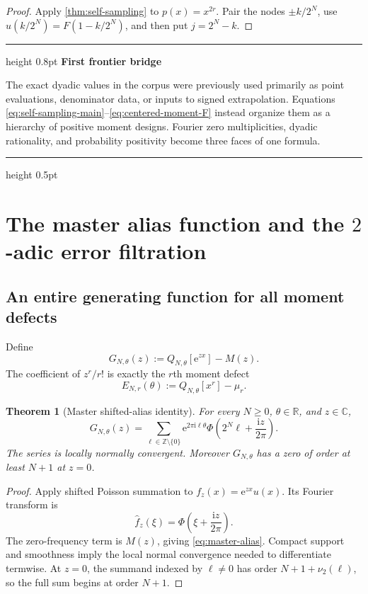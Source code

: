 \documentclass[11pt]{article}
\numberwithin{equation}{section}
\newtheorem{theorem}{Theorem}[section]
\theoremstyle{definition}
\theoremstyle{remark}
\newenvironment{resultbox}[1][]
{\begin{center}\begin{minipage}{0.94\textwidth}%
\color{navy}\hrule height 0.8pt\vspace{0.45em}%
\color{black}\textbf{#1}\par\smallskip}
{\vspace{0.35em}\color{navy}\hrule height 0.5pt\end{minipage}\end{center}}
\newcommand{\R}{\mathbb R}
\newcommand{\Z}{\mathbb Z}
\newcommand{\C}{\mathbb C}
\newcommand{\e}{\mathrm e}
\newcommand{\iu}{\mathrm i}
\begin{document}
\begin{proof}
Apply \cref{thm:self-sampling} to $p(x)=x^{2r}$.  Pair the nodes $\pm k/2^N$, use $u(k/2^N)=F(1-k/2^N)$, and then put $j=2^N-k$.
\end{proof}

\begin{resultbox}[First frontier bridge]
The exact dyadic values in the corpus were previously used primarily as point evaluations, denominator data, or inputs to signed extrapolation.  Equations \eqref{eq:self-sampling-main}--\eqref{eq:centered-moment-F} instead organize them as a hierarchy of positive moment designs.  Fourier zero multiplicities, dyadic rationality, and probability positivity become three faces of one formula.
\end{resultbox}

\section{The master alias function and the $2$-adic error filtration}
\label{sec:alias}

\subsection{An entire generating function for all moment defects}

Define
\begin{equation}
 G_{N,\theta}(z)
 :=Q_{N,\theta}[\e^{zx}]-M(z).
 \label{eq:G-def}
\end{equation}
The coefficient of $z^r/r!$ is exactly the $r$th moment defect
\begin{equation}
 E_{N,r}(\theta)
 :=Q_{N,\theta}[x^r]-\mu_r.
 \label{eq:ENr-def}
\end{equation}

\begin{theorem}[Master shifted-alias identity]
\label{thm:master-alias}
For every $N\ge0$, $\theta\in\R$, and $z\in\C$,
\begin{equation}
 \boxed{\displaystyle
 G_{N,\theta}(z)
 =\sum_{\ell\in\Z\setminus\{0\}}
 \e^{2\pi\iu\ell\theta}
 \Phi\!\left(2^N\ell+\frac{\iu z}{2\pi}\right).}
 \label{eq:master-alias}
\end{equation}
The series is locally normally convergent.  Moreover $G_{N,\theta}$ has a zero of order at least $N+1$ at $z=0$.
\end{theorem}

\begin{proof}
Apply shifted Poisson summation to $f_z(x)=\e^{zx}u(x)$.  Its Fourier transform is
\[
 \widehat f_z(\xi)
 =\Phi\!\left(\xi+\frac{\iu z}{2\pi}\right).
\]
The zero-frequency term is $M(z)$, giving \eqref{eq:master-alias}.  Compact support and smoothness imply the local normal convergence needed to differentiate termwise.  At $z=0$, the summand indexed by $\ell\ne0$ has order
$N+1+\nu_2(\ell)$, so the full sum begins at order $N+1$.
\end{proof}
\end{document}
